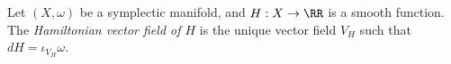 

Let $(X,  \omega)$ be a symplectic manifold, and  $H: X\to \RR$ is a smooth function. The \emph{Hamiltonian vector field of $H$} is the unique vector field $V_H$ such that $dH=\iota_{V_H}\omega$.

